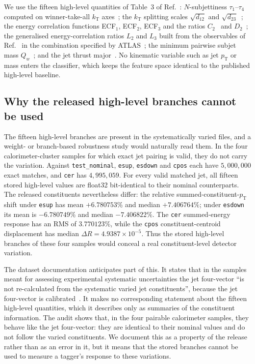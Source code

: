 \documentclass[pdflatex,sn-mathphys,Numbered,iicol]{sn-jnl}
\newcommand{\pt}{p_{\mathrm{T}}}
\begin{document}
We use the fifteen high-level quantities of Table~3 of Ref.~\cite{ATLAS2024}:
$N$-subjettiness $\tau_1$--$\tau_4$ computed on winner-take-all $k_{\mathrm{T}}$
axes~\cite{Thaler2011,Thaler2012,Larkoski2014WTA}; the $k_{\mathrm{T}}$ splitting
scales $\sqrt{d_{12}}$ and $\sqrt{d_{23}}$~\cite{Thaler2008}; the energy correlation functions
ECF$_1$, ECF$_2$, ECF$_3$ and the ratios $C_2$~\cite{Larkoski2013} and
$D_2$~\cite{Larkoski2014PC,Larkoski2016D2}; the generalised energy-correlation ratios $L_2$ and $L_3$
built from the observables of Ref.~\cite{Moult2016} in the combination specified by
ATLAS~\cite{ATLASPub2021}; the minimum pairwise subjet mass
$Q_w$~\cite{Kaplan2008}; and the jet thrust major~\cite{Chen2012}. No kinematic variable such as jet
$\pt$ or mass enters the classifier, which keeps the feature space identical to the
published high-level baseline.

\subsection{Why the released high-level branches cannot be used}
\label{sec:stale}

The fifteen high-level branches are present in the systematically varied files, and a
weight- or branch-based robustness study would naturally read them. In the four
calorimeter-cluster samples for which exact jet pairing is valid, they do not carry
the variation. Against \texttt{test\_nominal}, \texttt{esup}, \texttt{esdown} and
\texttt{cpos} each have $5{,}000{,}000$ exact matches, and \texttt{cer} has
$4{,}995{,}059$. For every valid matched jet, all fifteen stored high-level values
are float32 bit-identical to their nominal counterparts. The released constituents
nevertheless differ: the relative summed-constituent-$\pt$ shift under
\texttt{esup} has mean $+6.780753\%$ and median $+7.406764\%$; under
\texttt{esdown} its mean is $-6.780749\%$ and median $-7.406822\%$.
The \texttt{cer} summed-energy response has an RMS of $3.770123\%$, while the
\texttt{cpos} constituent-centroid displacement has median
$\Delta R=4.9387\times10^{-5}$. Thus the stored high-level branches of these
four samples would conceal a real constituent-level detector variation.

The dataset documentation anticipates part of this. It states that in the samples
meant for assessing experimental systematic uncertainties the jet four-vector ``is not
re-calculated from the systematic varied jet constituents'', because the jet
four-vector is calibrated~\cite{ATLASGitLab}. It makes no corresponding statement about
the fifteen high-level quantities, which it describes only as summaries of the
constituent information. The audit shows that, in the four pairable calorimeter
samples, they behave like the jet four-vector: they are identical to their nominal
values and do not follow the varied constituents. We document this as a property of
the release rather than as an error in it, but it means that the stored branches
cannot be used to measure a tagger's response to these variations.
\end{document}
